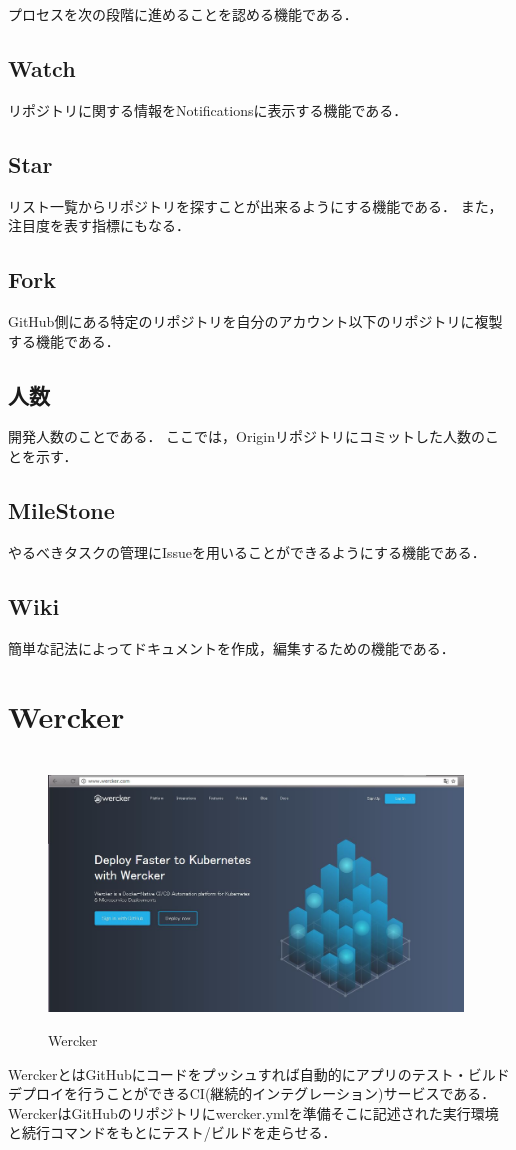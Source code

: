 プロセスを次の段階に進めることを認める機能である．


\subsection{Watch}

リポジトリに関する情報をNotificationsに表示する機能である．

\subsection{Star}

リスト一覧からリポジトリを探すことが出来るようにする機能である．
また，注目度を表す指標にもなる．

\subsection{Fork}

GitHub側にある特定のリポジトリを自分のアカウント以下のリポジトリに複製する機能である．

\subsection{人数}
開発人数のことである．
ここでは，Originリポジトリにコミットした人数のことを示す．

\subsection{MileStone}

やるべきタスクの管理にIssueを用いることができるようにする機能である．

\subsection{Wiki}

簡単な記法によってドキュメントを作成，編集するための機能である．

\newpage
\section{Wercker}
\begin{figure}[htb]
\centering　
\includegraphics[width=11cm]{30.JPG}
\caption{Wercker}\label{tab:uac}
\end{figure}
WerckerとはGitHubにコードをプッシュすれば自動的にアプリのテスト・ビルドデプロイを行うことができるCI(継続的インテグレーション)サービスである．
WerckerはGitHubのリポジトリにwercker.ymlを準備そこに記述された実行環境と続行コマンドをもとにテスト/ビルドを走らせる．

